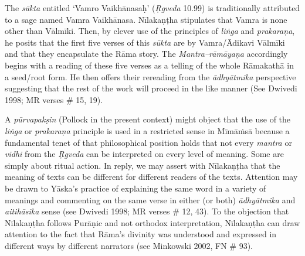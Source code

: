 The \textit{sūkta} entitled ‘Vamro Vaikhānasaḥ’ (\textit{Ṛgveda} 10.99) is traditionally attributed to a sage named Vamra Vaikhānasa. Nīlakaṇṭha stipulates that Vamra is none other than Vālmīki. Then, by clever use of the principles of \textit{liṅga} and \textit{prakaraṇa}, he posits that the first five verses of this \textit{sūkta} are by Vamra/Ādikavi Vālmīki and that they encapsulate the Rāma story. The \textit{Mantra–rāmāyaṇa} accordingly begins with a reading of these five verses as a telling of the whole Rāmakathā in a seed/root form. He then offers their rereading from the \textit{ādhyātmika} perspective suggesting that the rest of the work will proceed in the like manner (See Dwivedi 1998; MR verses \# 15, 19).

A \textit{pūrvapakṣin} (Pollock in the present context) might object that the use of the \textit{liṅga} or \textit{prakaraṇa} principle is used in a restricted sense in Mīmāṁsā because a fundamental tenet of that philosophical position holds that not every \textit{mantra} or \textit{vidhi} from the \textit{Ṛgveda} can be interpreted on every level of meaning. Some are simply about ritual action. In reply, we may assert with Nīlakaṇṭha that the meaning of texts can be different for different readers of the texts. Attention may be drawn to Yāska's practice of explaining the same word in a variety of meanings and commenting on the same verse in either (or both) \textit{ādhyātmika} and \textit{aitihāsika} sense (see Dwivedi 1998; MR verses \# 12, 43). To the objection that Nīlakaṇṭha follows Purāṇic and not orthodox interpretation, Nīlakaṇṭha can draw attention to the fact that Rāma's divinity was understood and expressed in different ways by different narrators (see Minkowski 2002, FN \# 93).

